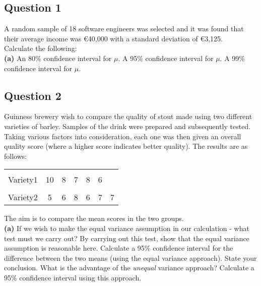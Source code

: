 \documentclass[12pt]{article}
\begin{document}
\subsection*{Question 1}
A random sample of 18 software engineers was selected and it was found that their average income was \euro{40,000} with a standard deviation of \euro{3,125}. \\[-0.2cm]

Calculate the following:\\[0.2cm]
{\bf(a)} An 80\% confidence interval for $\mu$.  A 95\% confidence interval for $\mu$.  A 99\% confidence interval for $\mu$.



\subsection*{Question 2}
Guinness brewery wish to compare the quality of stout made using two different varieties of barley. Samples of the drink were prepared and subsequently tested. Taking various factors into consideration, each one was then given an overall quality score (where a higher score indicates better quality). The results are as follows:\\[-0.3cm]
\begin{center}
\begin{tabular}{|c|cccccc|}
\cline{1-7}
&&&&&&\\[-0.2cm]
Variety1 & 10 & 8 & 7 & 8 & 6 & \\[0.2cm]
\cline{1-7}
&&&&&&\\[-0.2cm]
Variety2 & 5  & 6 & 8 & 6 & 7 & 7 \\[0.2cm]
\cline{1-7}
\end{tabular}
\end{center}

The aim is to compare the mean scores in the two groups.\\[0.3cm]
{\bf(a)} If we wish to make the equal variance assumption in our calculation - what test must we carry out?  By carrying out this test, show that the equal variance assumption is reasonable here.  Calculate a 95\% confidence interval for the difference between the two means (using the equal variance approach). State your conclusion.  What is the advantage of the \emph{unequal} variance approach? Calculate a 95\% confidence interval using this approach.
\end{document}
